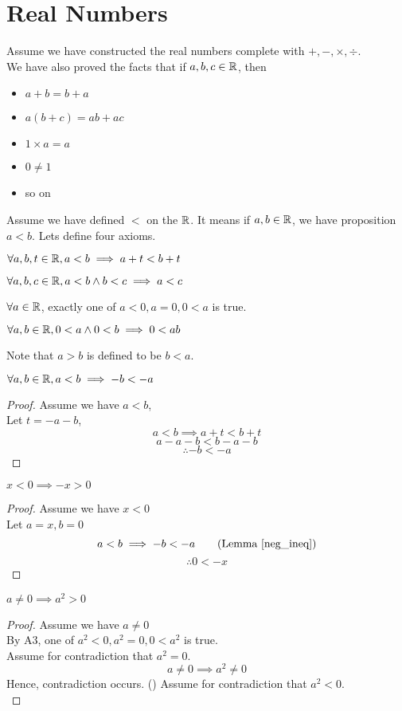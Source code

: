 \documentclass[a4paper]{article}
\begin{document}
\section{Real Numbers}
Assume we have constructed the real numbers complete with $+, -, \times, \div$.\\
We have also proved the facts that if $a,b,c \in \mathbb{R}$, then
\begin{itemize}
	\item $a + b = b + a$
	\item $a(b+c) = ab + ac$
	\item $1 \times a = a$
	\item $0 \neq 1$
	\item so on
\end{itemize}
Assume we have defined $<$ on the $\mathbb{R}$. It means if $a,b \in \mathbb{R}$, we have proposition $a < b$. Lets define four axioms.
\begin{axiom}[A1]\label{A1}
$\forall a, b, t \in \mathbb{R}, a < b \implies a + t < b + t$
\end{axiom}
\begin{axiom}[A2]\label{A2}
$\forall a, b, c \in \mathbb{R}, a < b \land b < c \implies a < c$
\end{axiom}
\begin{axiom}[A3]\label{A3}
$\forall a \in \mathbb{R}$, exactly one of $a<0, a=0, 0<a$ is true.
\end{axiom}
\begin{axiom}[A4]\label{A4}
$\forall a, b \in \mathbb{R}, 0 < a \land 0 < b \implies 0 < ab$
\end{axiom}
\begin{notation}
Note that $a > b$ is defined to be $b < a$.
\end{notation}

\begin{nlemma}\label{neg_ineq}
$\forall a, b \in \mathbb{R}, a < b \implies -b < -a$
\end{nlemma}
\begin{proof}
Assume we have $a < b$,\\
Let $t = -a-b$,
\[
a < b \implies a + t < b + t \tag{A1}
\]
\[
a - a - b < b - a - b
\]
\[
\therefore -b < -a
\]
\end{proof}
\begin{nlemma}
$x < 0 \implies -x > 0$
\end{nlemma}
\begin{proof}
Assume we have $x < 0$\\
Let $a = x, b = 0$\\
\[
a < b \implies -b < -a \tag{Lemma~\ref{neg_ineq}}
\]
\[
\therefore 0 < -x
\]
\end{proof}
\begin{nlemma}
$a \neq 0 \implies a^2 > 0$
\end{nlemma}
\begin{proof}
Assume we have $a \neq 0$\\
By A3, one of $a^2 < 0, a^2 = 0, 0 < a^2$ is true.\\
Assume for contradiction that $a^2 = 0$.\\
$$a \neq 0 \implies a^2 \neq 0$$
Hence, contradiction occurs. (\contradiction)
Assume for contradiction that $a^2 < 0$.\\

\end{proof}
\end{document}
